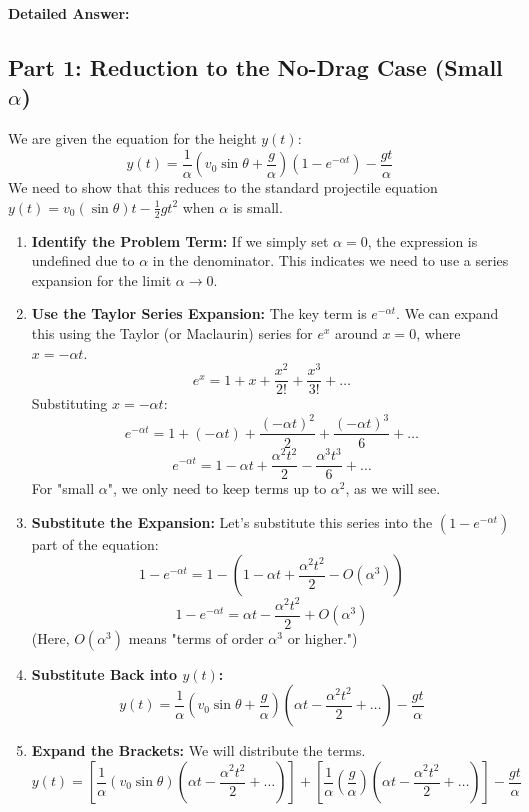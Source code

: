 \documentclass[11pt, a4paper]{article} %
\begin{document}
\hrulefill

\textbf{Detailed Answer:}

\subsection*{Part 1: Reduction to the No-Drag Case (Small $\alpha$)}

We are given the equation for the height $y(t)$:
$$y(t) = \frac{1}{\alpha} \left( v_0 \sin \theta + \frac{g}{\alpha} \right) \left( 1 - e^{-\alpha t} \right) - \frac{g t}{\alpha}$$
We need to show that this reduces to the standard projectile equation $y(t)=v_0(\sin\theta) t - \frac{1}{2}gt^2$ when $\alpha$ is small.

\begin{enumerate}
    \item \textbf{Identify the Problem Term:} If we simply set $\alpha = 0$, the expression is undefined due to $\alpha$ in the denominator. This indicates we need to use a series expansion for the limit $\alpha \to 0$.

    \item \textbf{Use the Taylor Series Expansion:} The key term is $e^{-\alpha t}$. We can expand this using the Taylor (or Maclaurin) series for $e^x$ around $x=0$, where $x = -\alpha t$.
    $$e^x = 1 + x + \frac{x^2}{2!} + \frac{x^3}{3!} + \dots$$
    Substituting $x = -\alpha t$:
    $$e^{-\alpha t} = 1 + (-\alpha t) + \frac{(-\alpha t)^2}{2} + \frac{(-\alpha t)^3}{6} + \dots$$
    $$e^{-\alpha t} = 1 - \alpha t + \frac{\alpha^2 t^2}{2} - \frac{\alpha^3 t^3}{6} + \dots$$
    For "small $\alpha$", we only need to keep terms up to $\alpha^2$, as we will see.

    \item \textbf{Substitute the Expansion:} Let's substitute this series into the $(1 - e^{-\alpha t})$ part of the equation:
    $$1 - e^{-\alpha t} = 1 - \left( 1 - \alpha t + \frac{\alpha^2 t^2}{2} - O(\alpha^3) \right)$$
    $$1 - e^{-\alpha t} = \alpha t - \frac{\alpha^2 t^2}{2} + O(\alpha^3)$$
    (Here, $O(\alpha^3)$ means "terms of order $\alpha^3$ or higher.")

    \item \textbf{Substitute Back into $y(t)$:}
    $$y(t) = \frac{1}{\alpha} \left( v_0 \sin \theta + \frac{g}{\alpha} \right) \left( \alpha t - \frac{\alpha^2 t^2}{2} + \dots \right) - \frac{g t}{\alpha}$$

    \item \textbf{Expand the Brackets:} We will distribute the terms.
    $$y(t) = \left[ \frac{1}{\alpha} (v_0 \sin \theta) \left( \alpha t - \frac{\alpha^2 t^2}{2} + \dots \right) \right] + \left[ \frac{1}{\alpha} \left(\frac{g}{\alpha}\right) \left( \alpha t - \frac{\alpha^2 t^2}{2} + \dots \right) \right] - \frac{g t}{\alpha}$$
    

\end{enumerate}
\end{document}

